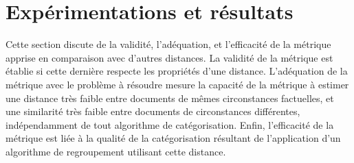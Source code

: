 
\section{Expérimentations et résultats}
\label{sec:similarite:experimentations}
Cette section discute de la validité, l'adéquation, et l'efficacité de la métrique apprise en comparaison avec d'autres distances. La validité de la métrique est établie si cette dernière respecte les propriétés d'une distance. L'adéquation de la métrique avec le problème à résoudre mesure la capacité de la métrique à estimer une distance très faible entre documents de mêmes circonstances factuelles, et une similarité très faible entre documents de circonstances différentes, indépendamment de tout algorithme de catégorisation. Enfin, l'efficacité de la métrique est liée à la qualité de la catégorisation résultant de l'application d'un algorithme de regroupement  utilisant cette distance.


